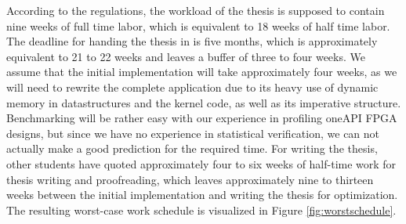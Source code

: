 According to the regulations, the workload of the thesis is supposed to contain nine weeks of full time labor, which is equivalent to 18 weeks of half time labor. The deadline for handing the thesis in is five months, which is approximately equivalent to 21 to 22 weeks and leaves a buffer of three to four weeks. We assume that the initial implementation will take approximately four weeks, as we will need to rewrite the complete application due to its heavy use of dynamic memory in datastructures and the kernel code, as well as its imperative structure. Benchmarking will be rather easy with our experience in profiling oneAPI FPGA designs, but since we have no experience in statistical verification, we can not actually make a good prediction for the required time. For writing the thesis, other students have quoted approximately four to six weeks of half-time work for thesis writing and proofreading, which leaves approximately nine to thirteen weeks between the initial implementation and writing the thesis for optimization. The resulting worst-case work schedule is visualized in Figure \ref{fig:worstschedule}.
